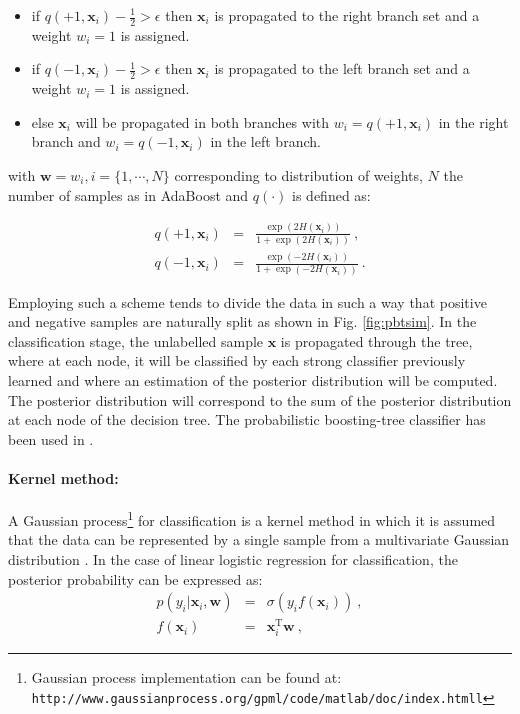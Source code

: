 \begin{itemize}
	\item if $q(+1, \mathbf{x}_i) - \frac{1}{2} > \epsilon$ then $\mathbf{x}_i$ is propagated to the right branch set and a weight $w_i=1$ is assigned. 
	\item if $q(-1, \mathbf{x}_i) - \frac{1}{2} > \epsilon$ then $\mathbf{x}_i$ is propagated to the left branch set and a weight $w_i=1$ is assigned.
	\item else $\mathbf{x}_i$ will be propagated in both branches with $w_i=q(+1, \mathbf{x}_i)$ in the right branch and $w_i=q(-1, \mathbf{x}_i)$ in the left branch.
\end{itemize}

\noindent with $\mathbf{w} = w_i, i=\{1,\cdots,N\}$ corresponding to distribution of weights, $N$ the number of samples as in AdaBoost and $q(\cdot)$ is defined as:

\begin{eqnarray}
	q(+1, \mathbf{x}_i) & = & \frac{\exp(2H(\mathbf{x}_i))}{1+\exp(2H(\mathbf{x}_i))} \ , \label{eq:regada1} \\
	q(-1, \mathbf{x}_i) & = & \frac{\exp(-2H(\mathbf{x}_i))}{1+\exp(-2H(\mathbf{x}_i))} \ . \label{eq:regada2}
\end{eqnarray}

\noindent Employing such a scheme tends to divide the data in such a way that positive and negative samples are naturally split as shown in Fig. \ref{fig:pbtsim}.
In the classification stage, the unlabelled sample $\mathbf{x}$ is propagated through the tree, where at each node, it will be classified by each strong classifier previously learned and where an estimation of the posterior distribution will be computed.
The posterior distribution will correspond to the sum of the posterior distribution at each node of the decision tree.
The probabilistic boosting-tree classifier has been used in \cite{Tiwari2009a,Tiwari2012,Tiwari2010,Viswanath2011}.

\paragraph{Kernel method:}
A Gaussian process\footnote{Gaussian process implementation can be found at: \texttt{http://www.gaussianprocess.org/gpml/\allowbreak code/matlab/doc/index.htmll}} for classification is a kernel method in which it is assumed that the data can be represented by a single sample from a multivariate Gaussian distribution \cite{Rasmussen2005}.
In the case of linear logistic regression for classification, the posterior probability can be expressed as:
\begin{eqnarray}
	p(y_i|\mathbf{x}_i,\mathbf{w}) & = & \sigma(y_i f(\mathbf{x}_i)) \ , \label{eq:gp1} \\
	f(\mathbf{x}_i) & = & \mathbf{x}_i^{\text{T}} \mathbf{w} \ , \nonumber
\end{eqnarray}

